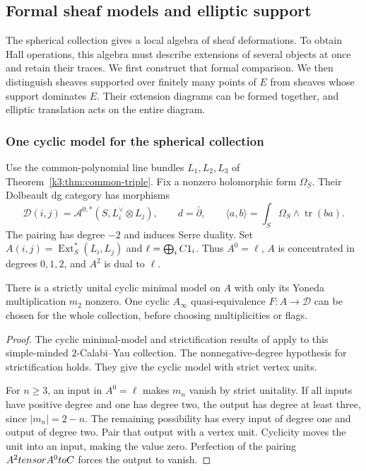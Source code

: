 \subsection{Formal sheaf models and elliptic support}
\label{subsec:hybrid-ran-carrier}

The spherical collection gives a local algebra of sheaf deformations.
To obtain Hall operations, this algebra must describe extensions of
several objects at once and retain their traces. We first construct
that formal comparison. We then distinguish sheaves supported over
finitely many points of $E$ from sheaves whose support dominates $E$.
Their extension diagrams can be formed together, and elliptic
translation acts on the entire diagram.

\subsubsection*{One cyclic model for the spherical collection}

Use the common-polynomial line bundles $L_1,L_2,L_3$ of
Theorem~\ref{k3:thm:common-triple}. Fix a nonzero holomorphic
form $\Omega_S$. Their Dolbeault dg category has morphisms
\[
 \mathcal D(i,j)=\mathcal A^{0,*}(S,L_i^\vee\otimes L_j),
 \qquad d=\bar\partial,
 \qquad
 \langle a,b\rangle=\int_S\Omega_S\wedge\operatorname{tr}(ba).
\]
The pairing has degree $-2$ and induces Serre duality. Set
$A(i,j)=\operatorname{Ext}_S^*(L_i,L_j)$ and
$\ell=\bigoplus_iC1_i$. Thus $A^0=\ell$, $A$ is concentrated in
degrees $0,1,2$, and $A^2$ is dual to $\ell$.

\begin{proposition}
\label{hall:prop:cyclic-collection}
There is a strictly unital cyclic minimal model on $A$ with only its
Yoneda multiplication $m_2$ nonzero. One cyclic $A_\infty$
quasi-equivalence $F:A\to\mathcal D$ can be chosen for the whole
collection, before choosing multiplicities or flags.
\end{proposition}

\begin{proof}
The cyclic minimal-model and strictification results of
\cite[Lemmas~4.4--4.5, Proposition~4.8 and Corollary~4.9]
{DavisonPurity2CY} apply to this simple-minded $2$-Calabi--Yau
collection. The nonnegative-degree hypothesis for strictification
holds. They give the cyclic model with strict vertex units.

For $n\geq3$, an input in $A^0=\ell$ makes $m_n$ vanish by strict
unitality. If all inputs have positive degree and one has degree two,
the output has degree at least three, since $|m_n|=2-n$.
The remaining possibility has every input of degree one and output
of degree two. Pair that output with a vertex unit. Cyclicity moves
the unit into an input, making the value zero. Perfection of the
pairing $A^2tensor A^0toC$ forces the output to vanish.
\end{proof}

